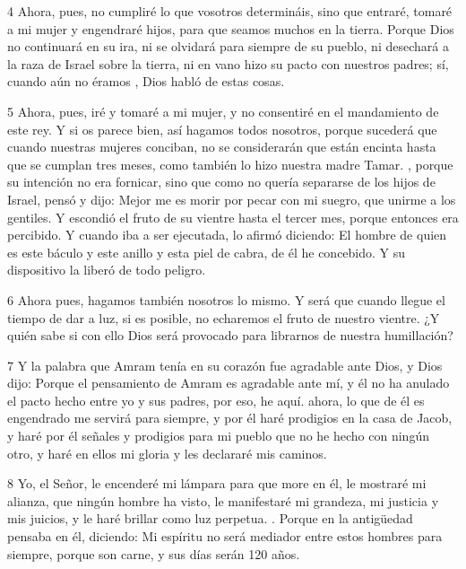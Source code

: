 \par 4 Ahora, pues, no cumpliré lo que vosotros determináis, sino que entraré, tomaré a mi mujer y engendraré hijos, para que seamos muchos en la tierra. Porque Dios no continuará en su ira, ni se olvidará para siempre de su pueblo, ni desechará a la raza de Israel sobre la tierra, ni en vano hizo su pacto con nuestros padres; sí, cuando aún no éramos , Dios habló de estas cosas.

\par 5 Ahora, pues, iré y tomaré a mi mujer, y no consentiré en el mandamiento de este rey. Y si os parece bien, así hagamos todos nosotros, porque sucederá que cuando nuestras mujeres conciban, no se considerarán que están encinta hasta que se cumplan tres meses, como también lo hizo nuestra madre Tamar. , porque su intención no era fornicar, sino que como no quería separarse de los hijos de Israel, pensó y dijo: Mejor me es morir por pecar con mi suegro, que unirme a los gentiles. Y escondió el fruto de su vientre hasta el tercer mes, porque entonces era percibido. Y cuando iba a ser ejecutada, lo afirmó diciendo: El hombre de quien es este báculo y este anillo y esta piel de cabra, de él he concebido. Y su dispositivo la liberó de todo peligro.

\par 6 Ahora pues, hagamos también nosotros lo mismo. Y será que cuando llegue el tiempo de dar a luz, si es posible, no echaremos el fruto de nuestro vientre. ¿Y quién sabe si con ello Dios será provocado para librarnos de nuestra humillación?

\par 7 Y la palabra que Amram tenía en su corazón fue agradable ante Dios, y Dios dijo: Porque el pensamiento de Amram es agradable ante mí, y él no ha anulado el pacto hecho entre yo y sus padres, por eso, he aquí. ahora, lo que de él es engendrado me servirá para siempre, y por él haré prodigios en la casa de Jacob, y haré por él señales y prodigios para mi pueblo que no he hecho con ningún otro, y haré en ellos mi gloria y les declararé mis caminos.

\par 8 Yo, el Señor, le encenderé mi lámpara para que more en él, le mostraré mi alianza, que ningún hombre ha visto, le manifestaré mi grandeza, mi justicia y mis juicios, y le haré brillar como luz perpetua. . Porque en la antigüedad pensaba en él, diciendo: Mi espíritu no será mediador entre estos hombres para siempre, porque son carne, y sus días serán 120 años.

